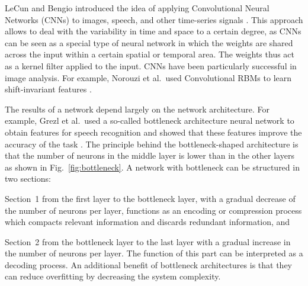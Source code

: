 \documentclass{article}
\begin{document}
LeCun and Bengio introduced the idea of applying Convolutional Neural Networks (CNNs) to images, speech, and other time-series signals \cite{lecun1995convolutional}. This approach allows to deal with the variability in time and space to a certain degree, as CNNs can be seen as a special type of neural network in which the weights are shared across the input within a certain spatial or temporal area. The weights thus act as a kernel filter applied to the input. CNNs have been particularly successful in image analysis. For example, Norouzi et al.\ used Convolutional RBMs to learn shift-invariant features \cite{norouzi2009stacks}. 

The results of a network depend largely on the network architecture. For example, Grezl et al.\ used a so-called bottleneck architecture neural network to obtain features for speech recognition and showed that these features improve the accuracy of the task \cite{grezl2007probabilistic}. The principle behind the bottleneck-shaped architecture is that the number of neurons in the middle layer is lower than in the other layers as shown in Fig.~\ref{fig:bottleneck}. A network with bottleneck can be structured in two sections:  
\begin{inparaenum}[(i)]
    \item   Section~1 from the first layer to the bottleneck layer, with a gradual decrease of the number of neurons per layer, functions as an encoding or compression process which compacts relevant information and discards redundant information, and 
    \item   Section~2 from the bottleneck layer to the last layer with a gradual increase in the number of neurons per layer. The function of this part can be interpreted as a decoding process. An additional benefit of bottleneck architectures is that they can reduce overfitting by decreasing the system complexity.
\end{inparaenum}
\end{document}
